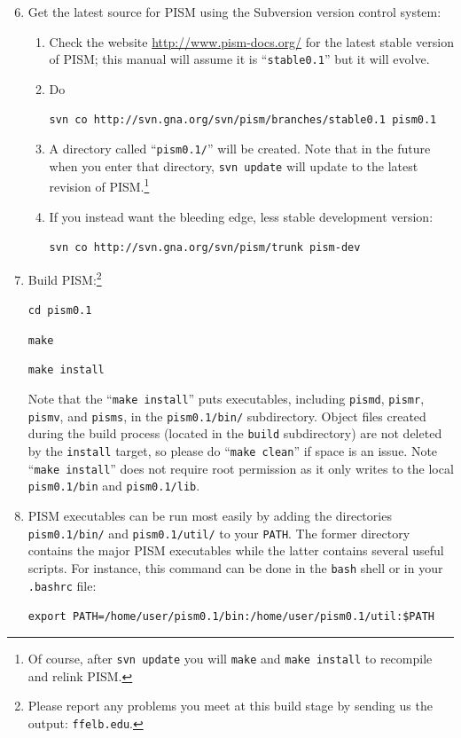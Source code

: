 \documentclass[11pt,final]{amsart}
\renewcommand{\t}[1]{\texttt{#1}}
\begin{document}
\begin{enumerate}\setcounter{enumi}{5}
\item Get the latest source for PISM using the Subversion version control system:
\begin{enumerate}
\item \label{getPISMstep} Check the website \url{http://www.pism-docs.org/} for the latest stable version of PISM; this manual will assume it is ``\texttt{stable0.1}'' but it will evolve.
\item Do

\verb|svn co http://svn.gna.org/svn/pism/branches/stable0.1 pism0.1|

\item A directory called ``\verb|pism0.1/|'' will be created.  Note that in the future when you enter that directory, \verb|svn update| will update to the latest revision of PISM.\footnote{Of course, after \t{svn update} you will \t{make} and \t{make install} to recompile and relink PISM.}

\item If you instead want the bleeding edge, less stable development version:

\verb|svn co http://svn.gna.org/svn/pism/trunk pism-dev|
\end{enumerate}

\item Build PISM:\footnote{Please report any problems you meet at this build stage by sending us the output: \t{ffelb\@@uaf.edu}.}

\verb|cd pism0.1|

\verb|make|

\verb|make install|

\noindent  Note that the ``\verb|make install|'' puts executables, including \verb|pismd|, \verb|pismr|, \verb|pismv|, and \verb|pisms|, in the \verb|pism0.1/bin/| subdirectory. Object files created during the build process (located in the \verb|build| subdirectory) are not deleted by the \verb|install| target, so please do ``\verb|make clean|'' if space is an issue. Note ``\verb|make install|'' does not require root permission as it only writes to the local \verb|pism0.1/bin| and \verb|pism0.1/lib|.

\item PISM executables can be run most easily by adding the directories \verb|pism0.1/bin/| and \verb|pism0.1/util/| to your \verb|PATH|.  The former directory contains the major PISM executables while the latter contains several useful scripts.  For instance, this command can be done in the \verb|bash| shell or in your \verb|.bashrc| file:

\verb|export PATH=/home/user/pism0.1/bin:/home/user/pism0.1/util:$PATH|
\end{enumerate}
\smallskip
\end{document}
